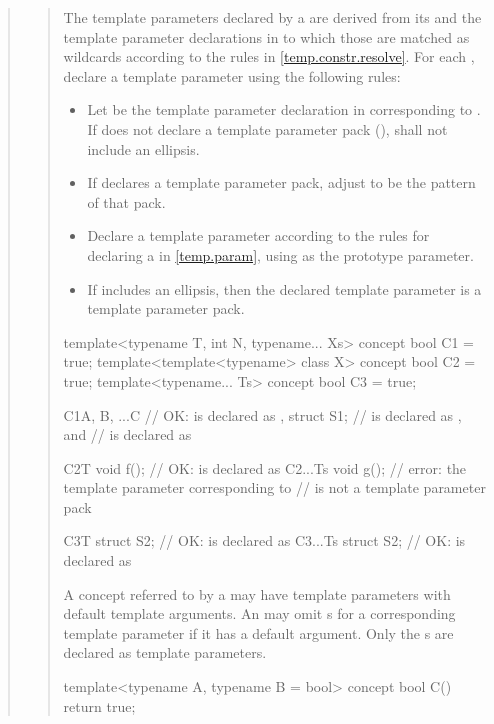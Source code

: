 \begin{quote}
\begin{quote}
\pnum
The template parameters declared by a 
are derived from its  and the
template parameter declarations in  to which those
 are matched as wildcards according to 
the rules in \ref{temp.constr.resolve}.
% 
For each  , declare a template
parameter using the following rules:
\begin{itemize}
\item Let  be the template parameter declaration in  
      corresponding to . If  does not declare a template 
      parameter pack (),  shall not include 
      an ellipsis.

\item If  declares a template parameter pack, adjust  
      to be the pattern of that pack.

\item Declare a template parameter according to the rules for declaring a
       in \ref{temp.param}, using
       as the prototype parameter.

\item If  includes an ellipsis, then the declared template parameter 
      is a template parameter pack.
\end{itemize}
% 
\enterexample
\begin{codeblock}
template<typename T, int N, typename... Xs> concept bool C1 = true;
template<template<typename> class X> concept bool C2 = true;
template<typename... Ts> concept bool C3 = true;

C1{A, B, ...C} // OK:  is declared as ,
  struct S1;   //  is declared as , and
               //  is declared as 

C2{T} void f();    // OK:  is declared as 
C2{...Ts} void g(); // error: the template parameter corresponding to 
                    // is not a template parameter pack

C3{T} struct S2;     // OK:  is declared as 
C3{...Ts} struct S2; // OK:  is declared as 
\end{codeblock}
\exitexample


\pnum
A concept referred to by a  may have template 
parameters with default template arguments. An  
may omit s for a corresponding template
parameter if it has a default argument. 
% 
Only the s are declared as template 
parameters.
% 
\enterexample
\begin{codeblock}
template<typename A, typename B = bool> concept bool C() { return true; }


\end{codeblock}
\end{quote}
\end{quote}
